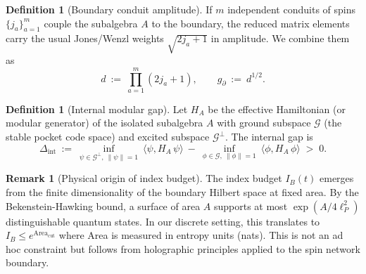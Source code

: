 \documentclass[11pt]{article}
\theoremstyle{plain}
\theoremstyle{definition}
\newtheorem{definition}[theorem]{Definition}
\newtheorem{remark}[theorem]{Remark}
\begin{document}
\begin{definition}[Boundary conduit amplitude]\label{def:conduit-amp}
  If $m$ independent conduits of spins $\{j_a\}_{a=1}^m$ couple the subalgebra $A$ to the boundary, the reduced matrix elements carry the usual Jones/Wenzl weights $\sqrt{2j_a+1}$ in amplitude. We combine them as
  \[
    d\ :=\ \prod_{a=1}^m (2j_a+1),\qquad
    g_{\partial}\ :=\ d^{1/2}.
  \]
\end{definition}

\begin{definition}[Internal modular gap]\label{def:mod-gap}
  Let $H_A$ be the effective Hamiltonian (or modular generator) of the isolated subalgebra $A$ with ground subspace $\mathcal{G}$ (the stable pocket code space) and excited subspace $\mathcal{G}^\perp$. The internal gap is
  \[
    \Delta_{\mathrm{int}}\ :=\ \inf_{\psi\in \mathcal{G}^\perp,\ \|\psi\|=1}\ \langle \psi, H_A\,\psi\rangle\ -\ \inf_{\phi\in \mathcal{G},\ \|\phi\|=1}\ \langle \phi, H_A\,\phi\rangle \;>\;0.
  \]
\end{definition}

\begin{remark}[Physical origin of index budget]
  The index budget $I_B(t)$ emerges from the finite dimensionality of the boundary Hilbert space at fixed area. By the Bekenstein-Hawking bound, a surface of area $A$ supports at most $\exp(A/4\ell_P^2)$ distinguishable quantum states. In our discrete setting, this translates to $I_B \leq e^{\mathrm{Area}_{\mathrm{cut}}}$ where Area is measured in entropy units (nats). This is not an ad hoc constraint but follows from holographic principles applied to the spin network boundary.
\end{remark}
\end{document}

